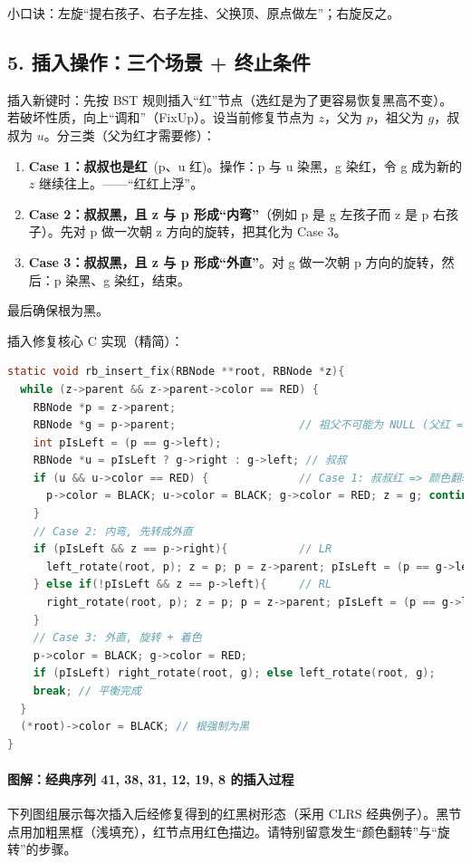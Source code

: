 \documentclass[lang=cn,newtx,10pt,scheme=chinese]{../elegantbook}
\begin{document}
小口诀：左旋“提右孩子、右子左挂、父换顶、原点做左”；右旋反之。

\subsection{5. 插入操作：三个场景 + 终止条件}
插入新键时：先按 BST 规则插入“红”节点（选红是为了更容易恢复黑高不变）。若破坏性质，向上“调和”（FixUp）。设当前修复节点为 \(z\)，父为 \(p\)，祖父为 \(g\)，叔叔为 \(u\)。分三类（父为红才需要修）：
\begin{enumerate}
  \item \textbf{Case 1：叔叔也是红}\ (p、u 红)。操作：p 与 u 染黑，g 染红，令 g 成为新的 \(z\) 继续往上。——“红红上浮”。
  \item \textbf{Case 2：叔叔黑，且 z 与 p 形成“内弯”}（例如 p 是 g 左孩子而 z 是 p 右孩子）。先对 p 做一次朝 z 方向的旋转，把其化为 Case 3。
  \item \textbf{Case 3：叔叔黑，且 z 与 p 形成“外直”}。对 g 做一次朝 p 方向的旋转，然后：p 染黑、g 染红，结束。
\end{enumerate}
最后确保根为黑。

插入修复核心 C 实现（精简）：
\begin{lstlisting}[language=C]
static void rb_insert_fix(RBNode **root, RBNode *z){
  while (z->parent && z->parent->color == RED) {
    RBNode *p = z->parent;
    RBNode *g = p->parent;                   // 祖父不可能为 NULL (父红 => 祖父存在)
    int pIsLeft = (p == g->left);
    RBNode *u = pIsLeft ? g->right : g->left; // 叔叔
    if (u && u->color == RED) {              // Case 1: 叔叔红 => 颜色翻转, 向上继续
      p->color = BLACK; u->color = BLACK; g->color = RED; z = g; continue;
    }
    // Case 2: 内弯, 先转成外直
    if (pIsLeft && z == p->right){           // LR
      left_rotate(root, p); z = p; p = z->parent; pIsLeft = (p == g->left);
    } else if(!pIsLeft && z == p->left){     // RL
      right_rotate(root, p); z = p; p = z->parent; pIsLeft = (p == g->left);
    }
    // Case 3: 外直, 旋转 + 着色
    p->color = BLACK; g->color = RED;
    if (pIsLeft) right_rotate(root, g); else left_rotate(root, g);
    break; // 平衡完成
  }
  (*root)->color = BLACK; // 根强制为黑
}
\end{lstlisting}

\paragraph{图解：经典序列 41, 38, 31, 12, 19, 8 的插入过程}
下列图组展示每次插入后经修复得到的红黑树形态（采用 CLRS 经典例子）。黑节点用加粗黑框（浅填充），红节点用红色描边。请特别留意发生“颜色翻转”与“旋转”的步骤。
\end{document}
